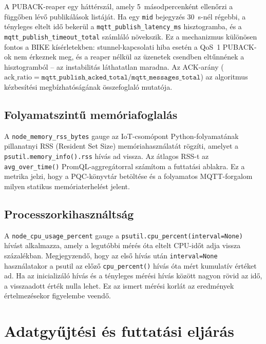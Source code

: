 A PUBACK-reaper egy háttérszál, amely 5~másodpercenként ellenőrzi a függőben lévő
publikálások listáját. Ha egy \texttt{mid} bejegyzés 30~s-nél régebbi, a tényleges
eltelt idő bekerül a \texttt{mqtt\_publish\_latency\_ms} hisztogramba, és a
\texttt{mqtt\_publish\_timeout\_total} számláló növekszik. Ez a mechanizmus
különösen fontos a BIKE kísérletekben: stunnel-kapcsolati hiba esetén a QoS~1
PUBACK-ok nem érkeznek meg, és a reaper nélkül az üzenetek csendben eltűnnének a
hisztogramból -- az instabilitás láthatatlan maradna. Az ACK-arány
($\text{ack\_ratio} = \texttt{mqtt\_publish\_acked\_total} /
\texttt{mqtt\_messages\_total}$) az algoritmus kézbesítési megbízhatóságának
összefoglaló mutatója.

\subsection{Folyamatszintű memóriafoglalás}

A \texttt{node\_memory\_rss\_bytes} gauge az IoT-csomópont Python-folyamatának pillanatnyi
RSS (Resident Set Size) memóriahasználatát rögzíti, amelyet a \texttt{psutil.memory\_info().rss}
hívás ad vissza. Az átlagos RSS-t az \texttt{avg\_over\_time()} PromQL-aggregátorral
számítom a futtatási ablakra. Ez a metrika jelzi, hogy a PQC-könyvtár betöltése
és a folyamatos MQTT-forgalom milyen statikus memóriaterhelést jelent.

\subsection{Processzorkihasználtság}

A \texttt{node\_cpu\_usage\_percent} gauge a \texttt{psutil.cpu\_percent(interval=None)}
hívást alkalmazza, amely a legutóbbi mérés óta eltelt CPU-időt adja vissza százalékban.
Megjegyzendő, hogy az első hívás után \texttt{interval=None} használatakor a psutil
az előző \texttt{cpu\_percent()} hívás óta mért kumulatív értéket ad. Ha az inicializáló
hívás és a tényleges mérési hívás között nagyon rövid az idő, a visszaadott érték nulla
lehet. Ez az ismert mérési korlát az eredmények értelmezésekor figyelembe veendő.

\section{Adatgyűjtési és futtatási eljárás}

